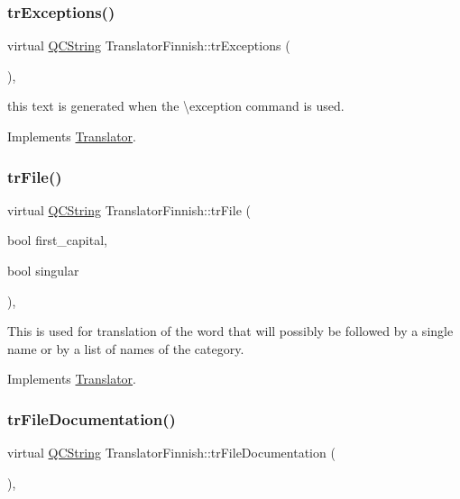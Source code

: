 \subsubsection{\texorpdfstring{trExceptions()}{trExceptions()}}
{\footnotesize\ttfamily virtual \mbox{\hyperlink{class_q_c_string}{Q\+C\+String}} Translator\+Finnish\+::tr\+Exceptions (\begin{DoxyParamCaption}{ }\end{DoxyParamCaption})\hspace{0.3cm}{\ttfamily [inline]}, {\ttfamily [virtual]}}

this text is generated when the \textbackslash{}exception command is used. 

Implements \mbox{\hyperlink{class_translator}{Translator}}.

\mbox{\label{class_translator_finnish_a8283f8506cd8f43b573c38a528ab98b6}} 
\subsubsection{\texorpdfstring{trFile()}{trFile()}}
{\footnotesize\ttfamily virtual \mbox{\hyperlink{class_q_c_string}{Q\+C\+String}} Translator\+Finnish\+::tr\+File (\begin{DoxyParamCaption}\item[{bool}]{first\+\_\+capital,  }\item[{bool}]{singular }\end{DoxyParamCaption})\hspace{0.3cm}{\ttfamily [inline]}, {\ttfamily [virtual]}}

This is used for translation of the word that will possibly be followed by a single name or by a list of names of the category. 

Implements \mbox{\hyperlink{class_translator}{Translator}}.

\mbox{\label{class_translator_finnish_ae42ccdfdbd32b1e34a3b0ccb64e6e18d}} 
\subsubsection{\texorpdfstring{trFileDocumentation()}{trFileDocumentation()}}
{\footnotesize\ttfamily virtual \mbox{\hyperlink{class_q_c_string}{Q\+C\+String}} Translator\+Finnish\+::tr\+File\+Documentation (\begin{DoxyParamCaption}{ }\end{DoxyParamCaption})\hspace{0.3cm}{\ttfamily [inline]}, {\ttfamily [virtual]}}

